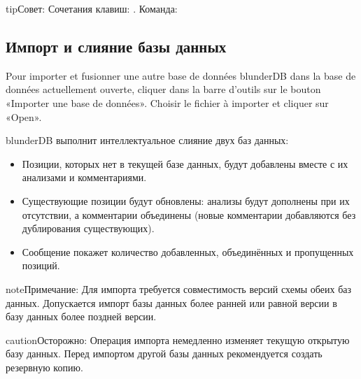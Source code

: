 \documentclass[letterpaper,10pt,russian]{sphinxmanual}
\begin{document}
\begin{sphinxadmonition}{tip}{Совет:}
\sphinxAtStartPar
Сочетания клавиш: . Команда: 
\end{sphinxadmonition}


\subsection{Импорт и слияние базы данных}
\label{\detokenize{guide_utilisateur:importer-et-fusionner-une-base-de-donnees}}
\sphinxAtStartPar
Pour importer et fusionner une autre base de données blunderDB dans la base de
données actuellement ouverte, cliquer dans la barre d’outils sur le bouton
«Importer une base de données». Choisir le fichier  à importer et
cliquer sur «Open».

\sphinxAtStartPar
blunderDB выполнит интеллектуальное слияние двух баз данных:
\begin{itemize}
\item {} 
\sphinxAtStartPar
Позиции, которых нет в текущей базе данных, будут добавлены вместе с их анализами и комментариями.

\item {} 
\sphinxAtStartPar
Существующие позиции будут обновлены: анализы будут дополнены при их отсутствии, а комментарии объединены (новые комментарии добавляются без дублирования существующих).

\item {} 
\sphinxAtStartPar
Сообщение покажет количество добавленных, объединённых и пропущенных позиций.

\end{itemize}

\begin{sphinxadmonition}{note}{Примечание:}
\sphinxAtStartPar
Для импорта требуется совместимость версий схемы обеих баз данных. Допускается импорт базы данных более ранней или равной версии в базу данных более поздней версии.
\end{sphinxadmonition}

\begin{sphinxadmonition}{caution}{Осторожно:}
\sphinxAtStartPar
Операция импорта немедленно изменяет текущую открытую базу данных. Перед импортом другой базы данных рекомендуется создать резервную копию.
\end{sphinxadmonition}
\end{document}

